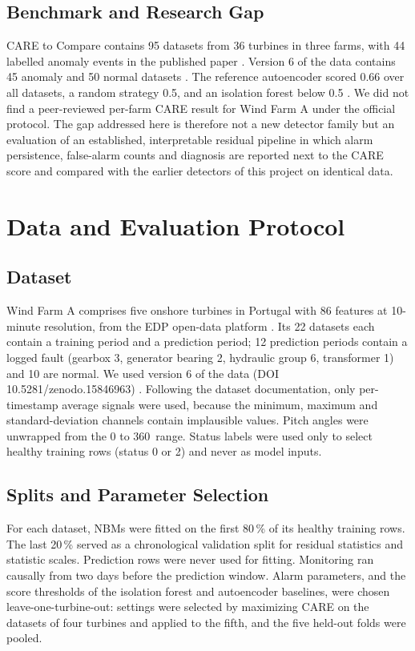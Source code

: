 \documentclass[conference]{IEEEtran}
\begin{document}
\subsection{Benchmark and Research Gap}
CARE to Compare contains 95 datasets from 36 turbines in three farms, with 44 labelled anomaly events in the published paper \cite{gueck2024care}. Version 6 of the data contains 45 anomaly and 50 normal datasets \cite{gueck2025zenodo}. The reference autoencoder scored 0.66 over all datasets, a random strategy 0.5, and an isolation forest below 0.5 \cite{gueck2024care}. We did not find a peer-reviewed per-farm CARE result for Wind Farm A under the official protocol. The gap addressed here is therefore not a new detector family but an evaluation of an established, interpretable residual pipeline in which alarm persistence, false-alarm counts and diagnosis are reported next to the CARE score and compared with the earlier detectors of this project on identical data.

\section{Data and Evaluation Protocol}
\subsection{Dataset}
Wind Farm A comprises five onshore turbines in Portugal with 86 features at 10-minute resolution, from the EDP open-data platform \cite{gueck2024care}. Its 22 datasets each contain a training period and a prediction period; 12 prediction periods contain a logged fault (gearbox 3, generator bearing 2, hydraulic group 6, transformer 1) and 10 are normal. We used version 6 of the data (DOI 10.5281/zenodo.15846963) \cite{gueck2025zenodo}. Following the dataset documentation, only per-timestamp average signals were used, because the minimum, maximum and standard-deviation channels contain implausible values. Pitch angles were unwrapped from the 0 to 360\,\textdegree{} range. Status labels were used only to select healthy training rows (status 0 or 2) and never as model inputs.

\subsection{Splits and Parameter Selection}
For each dataset, NBMs were fitted on the first 80\,\% of its healthy training rows. The last 20\,\% served as a chronological validation split for residual statistics and statistic scales. Prediction rows were never used for fitting. Monitoring ran causally from two days before the prediction window. Alarm parameters, and the score thresholds of the isolation forest and autoencoder baselines, were chosen leave-one-turbine-out: settings were selected by maximizing CARE on the datasets of four turbines and applied to the fifth, and the five held-out folds were pooled.
\end{document}
